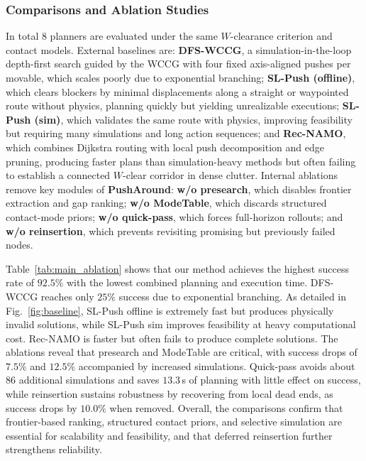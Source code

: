 \subsubsection{Comparisons and Ablation Studies}\label{subsec:comparisons}
In total $8$ planners are evaluated under the same $W$-clearance criterion and contact models. External
baselines are: \textbf{DFS-WCCG}, a simulation-in-the-loop depth-first search  guided by the WCCG
with four fixed axis-aligned pushes per movable, which scales poorly due to exponential branching;
\textbf{SL-Push (offline)}, which clears blockers by minimal displacements along a straight or
waypointed route without physics, planning quickly but yielding unrealizable executions;
\textbf{SL-Push (sim)}, which validates the same route with physics, improving feasibility but
requiring many simulations and long action sequences; and \textbf{Rec-NAMO}, which combines Dijkstra
routing with local push decomposition and edge pruning, producing faster plans than simulation-heavy
methods but often failing to establish a connected $W$-clear corridor in dense clutter. Internal
ablations remove key modules of \textbf{PushAround}: \textbf{w/o presearch}, which disables frontier extraction and
gap ranking; \textbf{w/o ModeTable}, which discards structured contact-mode priors; \textbf{w/o
quick-pass}, which forces full-horizon rollouts; and \textbf{w/o reinsertion}, which prevents
revisiting promising but previously failed nodes.

Table~\ref{tab:main_ablation} shows that our method achieves the highest success rate of $92.5\%$
with the lowest combined planning and execution time. DFS-WCCG reaches only $25\%$ success due to
exponential branching.
As detailed in Fig.~\ref{fig:baseline},
SL-Push offline is extremely fast but produces physically invalid solutions,
while SL-Push sim improves feasibility at heavy computational cost. Rec-NAMO is faster but often
fails to produce complete solutions. The ablations reveal that presearch and ModeTable are critical,
with success drops of $7.5\%$ and $12.5\%$ accompanied by increased simulations. 
Quick-pass avoids about $86$ additional simulations and saves $13.3$\,s of planning 
with little effect on success, 
while reinsertion sustains robustness by recovering from local dead ends, 
as success drops by $10.0\%$ when removed. Overall, 
the comparisons confirm that frontier-based ranking, 
structured contact priors, 
and selective simulation are essential for scalability and feasibility, and that
deferred reinsertion further strengthens reliability.


